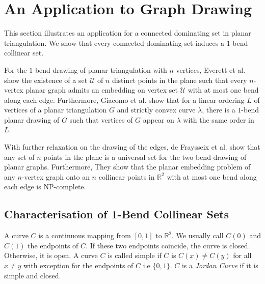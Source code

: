 \section{An Application to Graph Drawing}
\label{one_bend}
This section illustrates an application for a connected dominating set in planar triangulation. We show that every connected dominating set induces a $1$-bend collinear set.



For the $1$-bend drawing of planar triangulation with $n$ vertices,  Everett et al. \cite{DBLP:conf/gd/EverettLLW07} show the existence of a set $\mathcal{U}$ of $n$ distinct points in the plane such that every $n$-vertex planar graph admits an embedding on vertex set $\mathcal{U}$ with at most one bend along each edge. Furthermore, Giacomo et al. \cite{DBLP:journals/comgeo/GiacomoDLW05} show that for a linear ordering $L$ of vertices of a planar triangulation $G$ and strictly convex curve $\lambda$, there is a $1$-bend planar drawing of $G$ such that vertices of $G$ appear on $\lambda$ with the same order in $L$.

With further relaxation on the drawing of the edges, de Fraysseix et al. \cite{DBLP:journals/combinatorica/FraysseixPP90} show that any set of $n$ points in the plane is a universal set for the two-bend drawing of planar graphs. Furthermore, They show that the planar embedding problem of any $n$-vertex graph onto an $n$ collinear points in $\mathbb{R}^2$ with at most one bend along each edge is NP-complete.

\subsection{Characterisation of 1-Bend Collinear Sets}
A curve $C$ is a continuous mapping from $[0, 1]$ to $\mathbb{R}^2$. We usually call $C(0)$ and $C(1)$ the endpoints of $C$. If these two endpoints coincide, the curve is closed. Otherwise, it is open. A curve $C$ is called simple if $C$ is $C(x) \neq C(y)$ for all $x \neq y$ with exception for the endpoints of $C$ i.e $\{0, 1\}$. $C$ is a \textit{Jordan Curve} if it is simple and closed.

